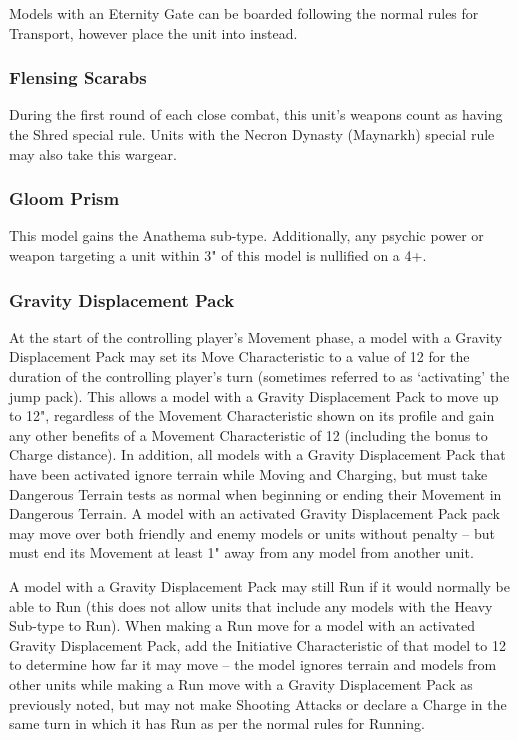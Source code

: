 Models with an Eternity Gate can be boarded following the normal rules for Transport, however place the unit into  instead.


\subsubsection{Flensing Scarabs} \label{Flensing Scarabs}

During the first round of each close combat, this unit's weapons count as having the Shred special rule. Units with the Necron Dynasty (Maynarkh) special rule may also take this wargear.

\subsubsection{Gloom Prism} \label{Gloom Prism}

This model gains the Anathema sub-type. Additionally, any psychic power or weapon targeting a unit within 3" of this model is nullified on a 4+. \\

\subsubsection{Gravity Displacement Pack} \label{Gravity Displacement Pack}

At the start of the controlling player’s Movement phase, a model with a Gravity Displacement Pack may set its Move Characteristic to a value of 12 for the duration of the controlling player’s turn (sometimes referred to as ‘activating’ the jump pack). This allows a model with a Gravity Displacement Pack to move up to 12", regardless of the Movement Characteristic shown on its profile and gain any other benefits of a Movement Characteristic of 12 (including the bonus to Charge distance). In addition, all models with a Gravity Displacement Pack that have been activated ignore terrain while Moving and Charging, but must take Dangerous Terrain tests as normal when beginning or ending their Movement in Dangerous Terrain. A model with an activated Gravity Displacement Pack pack may move over both friendly and enemy models or units without penalty – but must end its Movement at least 1" away from any model from another unit.

A model with a Gravity Displacement Pack may still Run if it would normally be able to Run (this does not allow units that include any models with the Heavy Sub-type to Run). When making a Run move for a model with an activated Gravity Displacement Pack, add the Initiative Characteristic of that model to 12 to determine how far it may move – the model ignores terrain and models from other units while making a Run move with a Gravity Displacement Pack as previously noted, but may not make Shooting Attacks or declare a Charge in the same turn in which it has Run as per the normal rules for Running.

